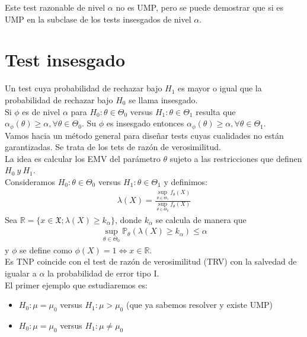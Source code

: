 \documentclass[10pt]{article}
\theoremstyle{plain}
\theoremstyle{definition}
\begin{document}
Este test razonable de nivel $\alpha$ no es UMP, pero se puede demostrar que si es UMP en la subclase de los tests insesgados de nivel $\alpha$.
\section{Test insesgado}
Un test cuya probabilidad de rechazar bajo $H_{1}$ es mayor o igual que la probabilidad de rechazar bajo $H_{0}$ se llama insesgado.\\
Si $\phi$ es de nivel $\alpha$ para $H_{0}: \theta \in \Theta_{0}$ versus $H_{1}: \theta \in \Theta_{1}$ resulta que $\alpha_{\phi}(\theta) \ge \alpha, \forall \theta \in \Theta_{0}$. Su $\phi$ es insesgado entonces $\alpha_{\phi}(\theta) \ge \alpha, \forall \theta \in \Theta_{1}$.\\

Vamos hacia un método general para diseñar tests cuyas cualidades no están garantizadas. Se trata de los tets de razón de verosimilitud.\\
La idea es calcular los EMV del parámetro $\theta$ sujeto a las restricciones que definen $H_{0}\ y\ H_{1}$.\\
Consideramos $H_{0}: \theta \in \Theta_{0}$ versus $H_{1}: \theta \in \Theta_{1}$ y definimos:
\begin{align*}
\lambda(X) = \frac{\sup_{\theta \in \Theta_{1}} f_{\theta}(X)}{\sup_{\theta \in \Theta_{0}} f_{\theta}(X)}
\end{align*}
Sea $\mathbb{R}=\{x\in\mathfrak{X}; \lambda(X) \ge k_{\alpha}\}$, donde $k_{\alpha}$ se calcula de manera que
\begin{align*}
\sup_{\theta \in \Theta_{0}} \mathbb{P}_{\theta}\left(\lambda(X) \ge k_{\alpha}\right) \le \alpha
\end{align*}
y $\phi$ se define como $\phi(X) = 1 \Leftrightarrow x \in \mathbb{R}$.\\

Es TNP coincide con el test de razón de verosimilitud (TRV) con la salvedad de igualar a $\alpha$ la probabilidad de error tipo I.\\

El primer ejemplo que estudiaremos es:
\begin{itemize}
\item $H_{0}: \mu = \mu_{0}$ versus $H_{1}: \mu > \mu_{0}$ (que ya sabemos resolver y existe UMP)
\item $H_{0}: \mu = \mu_{0}$ versus $H_{1}: \mu \not =\mu_{0}$
\end{itemize}
\end{document}
